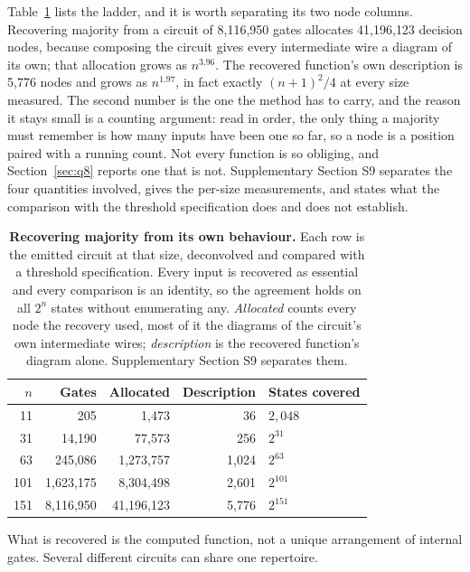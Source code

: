 \documentclass[11pt,a4paper]{article}
\begin{document}
Table~\ref{tab:majority} lists the ladder, and it is worth separating its two
node columns. Recovering majority from a circuit of 8{,}116{,}950 gates
allocates 41{,}196{,}123 decision nodes, because composing the circuit gives
every intermediate wire a diagram of its own; that allocation grows as
$n^{3.96}$. The recovered function's own description is 5{,}776 nodes and grows
as $n^{1.97}$, in fact exactly $(n+1)^2/4$ at every size measured. The second
number is the one the method has to carry, and the reason it stays small is a
counting argument: read in order, the only thing a majority must remember is
how many inputs have been one so far, so a node is a position paired with a
running count. Not every function is so obliging, and
Section~\ref{sec:q8} reports one that is not. Supplementary Section S9
separates the four quantities involved, gives the per-size measurements, and
states what the comparison with the threshold specification does and does not
establish.

\begin{table}[htbp]
\centering
\caption{\textbf{Recovering majority from its own behaviour.} Each row is the
emitted circuit at that size, deconvolved and compared with a threshold
specification. Every input is recovered as essential and every comparison is an
identity, so the agreement holds on all $2^n$ states without enumerating any.
\emph{Allocated} counts every node the recovery used, most of it the diagrams of
the circuit's own intermediate wires; \emph{description} is the recovered
function's diagram alone. Supplementary Section S9 separates
them.}\label{tab:majority}
\begin{tabular}{rrrrl}
\toprule
$n$ & Gates & Allocated & Description & States covered\\\midrule
11 & 205 & 1{,}473 & 36 & $2{,}048$\\
31 & 14{,}190 & 77{,}573 & 256 & $2^{31}$\\
63 & 245{,}086 & 1{,}273{,}757 & 1{,}024 & $2^{63}$\\
101 & 1{,}623{,}175 & 8{,}304{,}498 & 2{,}601 & $2^{101}$\\
151 & 8{,}116{,}950 & 41{,}196{,}123 & 5{,}776 & $2^{151}$\\
\bottomrule
\end{tabular}
\end{table}

What is recovered is the computed function, not a unique arrangement of
internal gates. Several different circuits can share one repertoire.
\end{document}
